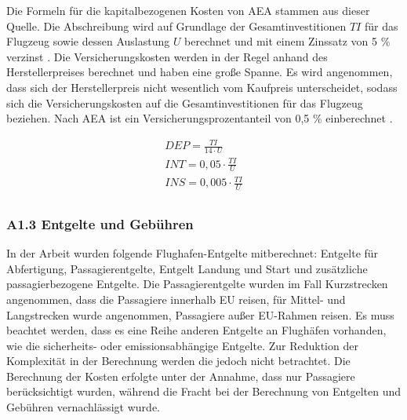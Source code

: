 Die Formeln für die kapitalbezogenen Kosten von AEA stammen aus dieser Quelle.
Die Abschreibung wird auf Grundlage der Gesamtinvestitionen $TI$ für das Flugzeug sowie dessen Auslastung $U$
berechnet und mit einem Zinssatz von 5 \% verzinst \cite{scholz_design_evaluation_doc}.
Die Versicherungskosten werden in der Regel anhand des Herstellerpreises berechnet
und haben eine große Spanne.
Es wird angenommen, dass sich der Herstellerpreis nicht wesentlich vom Kaufpreis unterscheidet, 
sodass sich die Versicherungskosten auf die Gesamtinvestitionen für das Flugzeug beziehen. 
Nach AEA ist ein Versicherungsprozentanteil von 0,5 \% einberechnet \cite{scholz_design_evaluation_doc}.

\begin{equation}
	\begin{split}
	{DEP} = \frac{TI}{14 \cdot U} \\
	{INT} = {0,05} \cdot \frac{TI}{U} \\
	{INS} = {0,005} \cdot \frac{TI}{U} \\
	\label{kapitalkosten}
 \end{split}
\end{equation}

\subsubsection{A1.3 Entgelte und Gebühren}

In der Arbeit wurden folgende Flughafen-Entgelte mitberechnet: Entgelte für Abfertigung, 
Passagierentgelte, Entgelt Landung und Start
und zusätzliche passagierbezogene Entgelte. Die Passagierentgelte wurden im Fall Kurzstrecken angenommen,
dass die Passagiere innerhalb EU reisen, für Mittel- und Langstrecken wurde angenommen, 
Passagiere außer EU-Rahmen reisen.
Es muss beachtet werden, dass es eine Reihe anderen Entgelte an Flughäfen vorhanden, 
wie die sicherheits- oder emissionsabhängige Entgelte. Zur Reduktion der Komplexität in der Berechnung werden die jedoch nicht betrachtet.
Die Berechnung der Kosten erfolgte unter der Annahme, dass nur Passagiere berücksichtigt wurden, 
während die Fracht bei der Berechnung von Entgelten und Gebühren vernachlässigt wurde.


